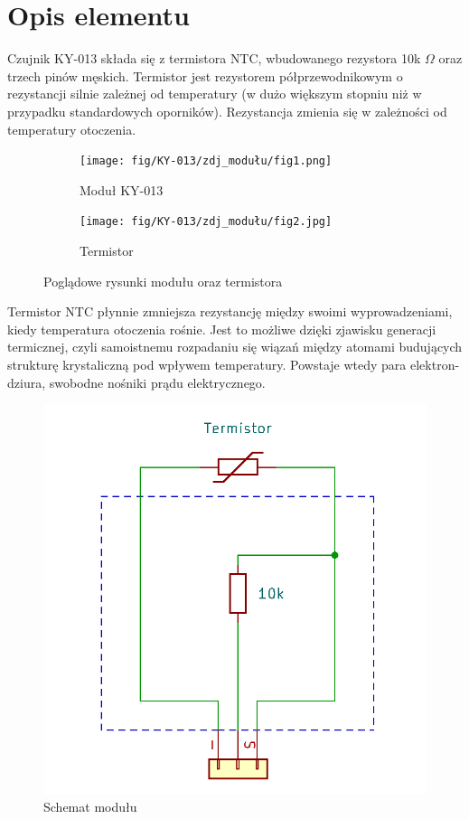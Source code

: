 \documentclass[11pt, a4paper]{article}
\author{Antoni Borowski}
\institute{Instytut Robotyki i Inteligencji Maszynowej}
\begin{document}
\newpage

\section*{Opis elementu} 
Czujnik KY-013 składa się z termistora NTC, wbudowanego rezystora 10k $\Omega$ oraz trzech pinów męskich. Termistor jest rezystorem półprzewodnikowym o rezystancji silnie zależnej od temperatury (w dużo większym stopniu niż w przypadku standardowych oporników). Rezystancja zmienia się w zależności od temperatury otoczenia. 
\vspace{0.5cm}
\begin{figure}[h!]
\centering
\begin{subfigure}{.5\textwidth}
  \centering
  \texttt{[image: fig/KY-013/zdj\_modułu/fig1.png]}
  \caption{Moduł KY-013 \cite{ArduinoModules:Switch}}
  \label{fig:sub1}
\end{subfigure}%
\begin{subfigure}{.5\textwidth}
  \centering
  \texttt{[image: fig/KY-013/zdj\_modułu/fig2.jpg]}
  \caption{Termistor \cite{ArduinoModules:grab}}
  \label{fig:sub2}
\end{subfigure}
\caption{Poglądowe rysunki modułu oraz termistora}
\label{fig:test}
\end{figure}

Termistor NTC płynnie zmniejsza rezystancję między swoimi wyprowadzeniami, kiedy temperatura otoczenia rośnie. Jest to możliwe dzięki zjawisku generacji termicznej, czyli samoistnemu rozpadaniu się wiązań między atomami budujących strukturę krystaliczną pod wpływem temperatury. Powstaje wtedy para elektron-dziura, swobodne nośniki prądu elektrycznego.

\begin{figure}[h!]
\centering
\includegraphics[width=.55\linewidth]{fig/KY-013/zasada_dzialania/schemacik.png}
\caption{Schemat modułu}
\label{fig:sub2}
\end{figure}
\end{document}
